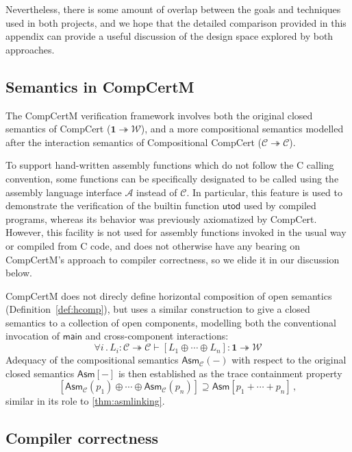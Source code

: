 \documentclass[sigplan,10pt,review]{acmart}
\newcommand{\kw}[1]{\ensuremath{ \mathsf{#1} }}
\begin{document}
Nevertheless,
there is some amount of overlap between
the goals and techniques used in both projects,
and we hope that the detailed comparison
provided in this appendix
can provide a useful discussion
of the design space explored by both approaches.

\subsection{Semantics in CompCertM} %

The CompCertM verification framework involves
both the original closed semantics of CompCert
($\mathbf{1} \twoheadrightarrow \mathcal{W}$),
and a more compositional semantics
modelled after the interaction semantics of Compositional CompCert
($\mathcal{C} \twoheadrightarrow \mathcal{C}$).

To support hand-written assembly functions
which do not follow the C calling convention,
some functions can be specifically designated
to be called
using the assembly language interface $\mathcal{A}$
instead of $\mathcal{C}$.
In particular,
this feature is used to demonstrate
the verification of the builtin function $\kw{utod}$
used by compiled programs,
whereas its behavior was previously
axiomatized by CompCert.
However,
this facility is not used for assembly functions
invoked in the usual way or compiled from C code,
and does not otherwise have any bearing on
CompCertM's approach to compiler correctness,
so we elide it in our discussion below.

CompCertM does not direcly define horizontal composition
of open semantics (Definition~\ref{def:hcomp}),
but uses a similar construction
to give a closed semantics to a collection of open components,
modelling both the conventional invocation of $\kw{main}$
and cross-component interactions:
\[
  \forall i \,.\,
  L_i : \mathcal{C} \twoheadrightarrow \mathcal{C} \vdash
  [L_1 \oplus \cdots \oplus L_n] : \mathbf{1} \twoheadrightarrow \mathcal{W}
\]
Adequacy of the compositional semantics $\kw{Asm}_\mathcal{C}(-)$
with respect to the original closed semantics $\kw{Asm}[-]$
is then established as the trace containment property
\begin{equation} \label{eqn:asmadeq}
  [\kw{Asm}_\mathcal{C}(p_1) \oplus \cdots \oplus \kw{Asm}_\mathcal{C}(p_n)] \supseteq
  \kw{Asm}[p_1 + \cdots + p_n]
  \,,
\end{equation}
similar in its role to \autoref{thm:asmlinking}.


\subsection{Compiler correctness} %
\end{document}
